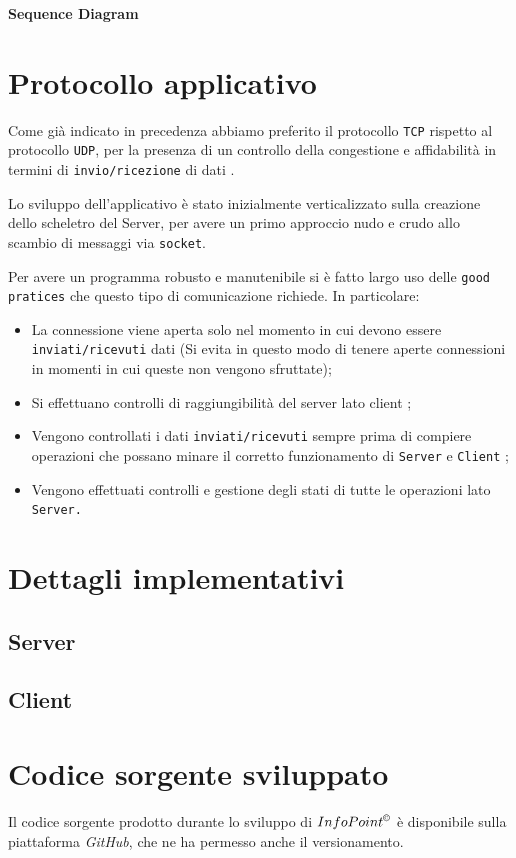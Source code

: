 \documentclass[letterpaper, 11pt]{article}
\begin{document}
\begin{center}
\textbf{Sequence Diagram}
\end{center}
\section{Protocollo applicativo}
\label{Protocollo applicativo}
Come già indicato in precedenza abbiamo preferito il protocollo \texttt{TCP} rispetto al protocollo \texttt{UDP}, per la presenza di un controllo della congestione e affidabilità in termini di \texttt{invio/ricezione} di dati \autocite{UDP}.

Lo sviluppo dell'applicativo è stato inizialmente verticalizzato sulla creazione dello scheletro del Server, per avere un primo approccio nudo e crudo allo scambio di messaggi via \texttt{socket}.

Per avere un programma robusto e manutenibile si è fatto largo uso delle \texttt{good pratices} che questo tipo di comunicazione richiede. In particolare:
\begin{itemize}
\item La connessione viene aperta solo nel momento in cui devono essere \texttt{inviati/ricevuti} dati (Si evita in questo modo di tenere aperte connessioni in momenti in cui queste non vengono sfruttate);
\item Si effettuano controlli di raggiungibilità del server lato client \autocite{RAGGIUNGIBILE};
\item Vengono controllati i dati \texttt{inviati/ricevuti} sempre prima di compiere operazioni che possano minare il corretto funzionamento di \texttt{Server} e \texttt{Client} \autocite{CONTROLLO};
\item Vengono effettuati controlli e gestione degli stati di tutte le operazioni lato \texttt{Server.}
\end{itemize}
\section{Dettagli implementativi}
\label{Dettagli implementativi}
\subsection{Server}
\label{Dettagli implementativi - Server}
\subsection{Client}
\label{Dettagli implementativi - Client}
\section{Codice sorgente sviluppato}
\label{Codice sorgente sviluppato}
Il codice sorgente prodotto durante lo sviluppo di \(InfoPoint^{\copyright}\) è disponibile sulla piattaforma \emph{GitHub}, che ne ha permesso anche il versionamento.
\end{document}
